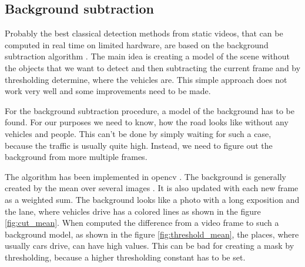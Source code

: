 \documentclass[a4paper,12pt,titlepage, twoside]{article}
\numberwithin{figure}{section}
\begin{document}
\subsection{Background subtraction}
\label{sec:bgs}

Probably the best classical detection methods from static videos, that can be computed in real time on limited hardware, are based on the background subtraction algorithm \cite{...}. The main idea is creating a model of the scene without the objects that we want to detect and then subtracting the current frame and by thresholding determine, where the vehicles are. This simple approach does not work very well and some improvements need to be made. 

For the background subtraction procedure, a model of the background has to be found. For our purposes we need to know, how the road looks like without any vehicles and people. This can't be done by simply waiting for such a case, because the traffic is usually quite high. Instead, we need to figure out the background from more multiple frames. 

The algorithm has been implemented in opencv \cite{opencv}. The background is generally created by the mean over several images \cite{bs1, bs2}. It is also updated with each new frame as a weighted sum. The background looks like a photo with a long exposition and the lane, where vehicles drive has a colored lines as shown in the figure \ref{fig:cut_mean}. When computed the difference from a video frame to such a background model, as shown in the figure \ref{fig:threshold_mean}, the places, where usually cars drive, can have high values. This can be bad for creating a mask by thresholding, because a higher thresholding constant has to be set.
\end{document}
